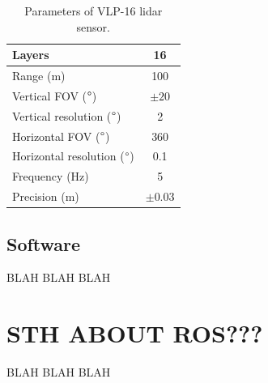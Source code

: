 \begin{table}[H]
\centering
\begin{tabular}{|l|c|}
\hline
Layers                            & 16   \\ \hline
Range (m)                         & 100  \\ \hline
Vertical FOV ($\degree$)          & $\pm20$   \\ \hline
Vertical resolution ($\degree$)   & 2    \\ \hline
Horizontal FOV ($\degree$)        & 360  \\ \hline
Horizontal resolution ($\degree$) & 0.1  \\ \hline
Frequency (Hz)                    & 5    \\ \hline
Precision (m)                     & $\pm0.03$ \\ \hline
\end{tabular}
\caption{Parameters of VLP-16 lidar sensor.}
\label{tab:lidar}
\end{table}

\subsection{Software}
BLAH BLAH BLAH


\section{STH ABOUT ROS???}
BLAH BLAH BLAH